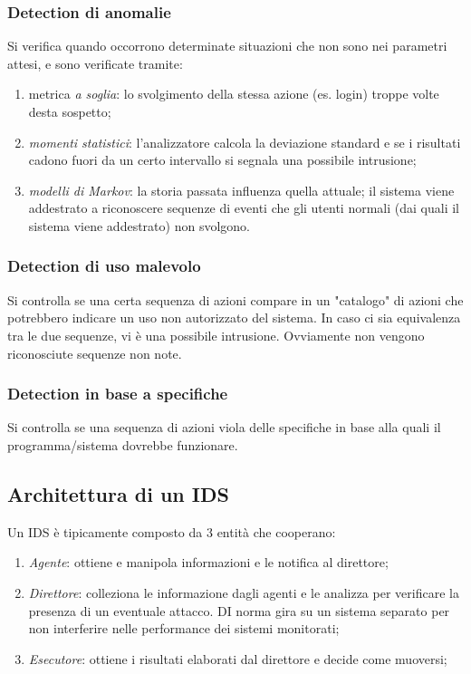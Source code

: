 \documentclass[a4paper, 11pt]{article}
\begin{document}
\begin{multicols}{2}
	\subsubsection{Detection di anomalie}
	Si verifica quando occorrono determinate situazioni che non sono nei parametri attesi, e sono verificate tramite:
	\begin{enumerate}
		\item metrica \textit{a soglia}: lo svolgimento della stessa azione (es. login) troppe volte desta sospetto;
		\item \textit{momenti statistici}: l'analizzatore calcola la deviazione standard e se i risultati cadono fuori da un certo intervallo si segnala una possibile intrusione;
		\item \textit{modelli di Markov}: la storia passata influenza quella attuale; il sistema viene addestrato a riconoscere sequenze di eventi che gli utenti normali (dai quali il sistema viene addestrato) non svolgono.
	\end{enumerate}

\subsubsection{Detection di uso malevolo}
Si controlla se una certa sequenza di azioni compare in un "catalogo" di azioni che potrebbero indicare un uso non autorizzato del sistema. In caso ci sia equivalenza tra le due sequenze, vi è una possibile intrusione. Ovviamente non vengono riconosciute sequenze non note.

\subsubsection{Detection in base a specifiche}
Si controlla se una sequenza di azioni viola delle specifiche in base alla quali il programma/sistema dovrebbe funzionare.

\subsection{Architettura di un IDS}
Un IDS è tipicamente composto da 3 entità che cooperano:
\begin{enumerate}
	\item \textit{Agente}: ottiene e manipola informazioni e le notifica al direttore;
	\item \textit{Direttore}: colleziona le informazione dagli agenti e le analizza per verificare la presenza di un eventuale attacco. DI norma gira su un sistema separato per non interferire nelle performance dei sistemi monitorati;
	\item \textit{Esecutore}: ottiene i risultati elaborati dal direttore e decide come muoversi;
\end{enumerate}


\end{multicols}
\end{document}
